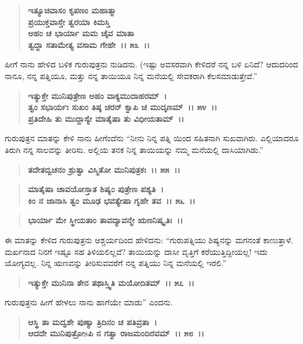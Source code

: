 \begin{verse}
\textbf{ಇತ್ಯೂಚಿವಾಸಂ ಕೃಪಣಂ ಮಹಾತ್ಮಾ} \\\textbf{ಪ್ರಯುಕ್ತವಾಸ್ತೇ ತ್ವರಯಾ ಕಿಮಸ್ತಿ}\\\textbf{ಅಹಂ ಚ ಭಾರ್ಯಾ ಮಮ ಚೈವ ಮಾತಾ} \\\textbf{ತ್ವದ್ದಾ ಸತಾಮೇತ್ಯ ವಸಾಮ ಗೇಹೇ~।। ೫೩~।।}
\end{verse}

ಹೀಗೆ ನಾನು ಹೇಳಿದ ಬಳಿಕ ಗುರುಪುತ್ರನು ನುಡಿದನು. (ಇಷ್ಟು ಅವಸರವಾಗಿ ಕೇಳಿದರೆ ನನ್ನ ಬಳಿ ಏನಿದೆ? ಆದುದರಿಂದ ನಾನೂ, ನನ್ನ ಪತ್ನಿಯೂ, ಮತ್ತು ನನ್ನ ತಾಯಿಯೂ ನಿನ್ನ ಮನೆಯಲ್ಲಿ ಸೇವಕರಾಗಿ ಕೆಲಸಮಾಡುತ್ತೇವೆ.”

\begin{verse}
\textbf{ಇತ್ಯುಕ್ತೇ ಮುನಿಪುತ್ರೇಣ ಅಹಂ ವಾಕ್ಯಮುದಾಹರಮ್~।}\\\textbf{ತ್ವಂ ಸಭಾರ್ಯಃ ಸುಖಂ ತಿಷ್ಠ ಚರನ್ ಕ್ವಾಪಿ ಚ ಮುದೃಣಮ್~।। ೫೪~।। }\\\textbf{ಪ್ರತಿದೇಹಿ ತು ಮುದ್ದಾಸ್ಯೇ ಮಾತೈಷಾ ತು ವಿಧೀಯತಾಮ್~।।}
\end{verse}

ಗುರುಪುತ್ರನ ಮಾತನ್ನು ಕೇಳಿ ನಾನು ಹೀಗೆಂದೆನು “ನೀನು ನಿನ್ನ ಪತ್ನಿ ಯಿಂದ ಸಹಿತನಾಗಿ ಸುಖವಾಗಿರು. ಎಲ್ಲಿಯಾದರೂ ತಿರುಗಿ ನನ್ನ ಸಾಲವನ್ನು ತೀರಿಸು. ಅಲ್ಲಿಯ ತನಕ ನಿನ್ನ ತಾಯಿಯನ್ನು ನಮ್ಮ ಮನೆಯಲ್ಲಿ ದಾಸಿಯಾಗಿಡು.”

\begin{verse}
\textbf{ತದೇತದ್ವಚನಂ ಶ್ರುತ್ವಾ ವಿಸ್ಮಿತೋ ಮುನಿಪುತ್ರಕಃ~।। ೫೫~।।} 
\end{verse}

\begin{verse}
\textbf{ಮಾತೈಷಾ ಚಾವಯೋಸ್ತಾತ ಶಿಷ್ಯಂ ಪುತ್ರೇಣ ಪಶ್ಯತಿ~।}\\\textbf{ಕಿಂ ನ ಜಾನಾಸಿ ತ್ವಂ ಮೂಢ ಭವತ್ಯೇಷಾ ಗೃಹೇ ತವ~।। ೫೬~।। }
\end{verse}

\begin{verse}
\textbf{ಭಾರ್ಯಾ ಮೇ ಸ್ಥೀಯತಾಂ ತಾವದ್ಯಾವನ್ಮೇ ಋಣನಿಷ್ಕೃತಿಃ~।।}
\end{verse}

ಈ ಮಾತನ್ನು ಕೇಳಿದ ಗುರುಪುತ್ರನು ಆಶ್ಚರ್ಯದಿಂದ ಹೇಳಿದನು: “ಗುರುಪತ್ನಿಯು ಶಿಷ್ಯನನ್ನು ಮಗನಂತೆ ಕಾಣುತ್ತಾಳೆ. ಮರ್ಖನಾದ ನಿನಗೆ ಇಷ್ಟೂ ಸಹ ತಿಳಿಯಲಿಲ್ಲವೆ? ತಾಯಿಯನ್ನು ದಾಸೀ ವೃತ್ತಿಗೆ ಕರೆಯುತ್ತಿದ್ದೀಯಲ್ಲ! ಇದು ಯೋಗ್ಯವಲ್ಲ. ನಿನ್ನ ಋಣವನ್ನು ತೀರಿಸುವವರೆಗೆ ನನ್ನ ಪತ್ನಿಯು ನಿನ್ನ ಮನೆಯಲ್ಲಿ ಇರಲಿ.”

\begin{verse}
\textbf{ಇತ್ಯುಕ್ತೇ ಮುನಿನಾ ತೇನ ತಥಾಸ್ತ್ವಿತಿ ಮಯೋದಿತಮ್~।। ೫೭~।।} 
\end{verse}

ಗುರುಪುತ್ರನು ಹೀಗೆ ಹೇಳಲು ನಾನು ಹಾಗೆಯೇ ಮಾಡು” ಎಂದನು.

\begin{verse}
\textbf{ಆಸ್ಥಿ ತಾ ಮದ್ವಶೇ ಪುಣ್ಯಾ ತ್ರಿದಿನಂ ಚ ಪತಿವ್ರತಾ~।}\\\textbf{ಆದದೇ ಮುನಿಪುತ್ರೋsಪಿ ನ ಗತ್ವಾ ರಾಜಮಂದಿರವಮ್~।। ೫೮~।। }
\end{verse}

